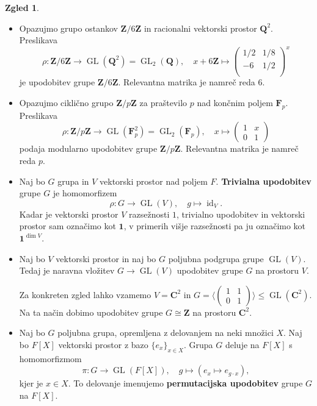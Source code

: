 \documentclass[11pt]{book}
\def\ZZ{\mathbf{Z}}
\def\QQ{\mathbf{Q}}
\def\CC{\mathbf{C}}
\def\oneone{\mathbf{1}}
\def\FF{\mathbf{F}}
\DeclareMathOperator\GL{GL}
\DeclareMathOperator\id{id}
\def\definicija{\color{rdeca}\bf}
\theoremstyle{definition}
\theoremstyle{zgled}
\newtheorem{zgled}[theorem]{Zgled}
\theoremstyle{zgledbrezstevilke}
\theoremstyle{odprtproblem}
\theoremstyle{domacanaloga}
\theoremstyle{izrek}
\begin{document}
\begin{zgled}
\begin{itemize}
        \item Opazujmo grupo ostankov $\ZZ/6\ZZ$ in racionalni vektorski prostor $\QQ^2$. Preslikava
        \[
            \rho \colon \ZZ/6\ZZ \to \GL(\QQ^2) = {\textstyle \GL_2(\QQ)}, \quad
            x + 6 \ZZ \mapsto  \begin{pmatrix}
                1/2 & 1/8 \\
                -6 & 1/2 \\
            \end{pmatrix}^x
        \]
        je upodobitev grupe $\ZZ/6\ZZ$. Relevantna matrika je namreč reda $6$.
        
        \item Opazujmo ciklično grupo $\ZZ/p\ZZ$ za praštevilo $p$ nad končnim poljem $\FF_p$. Preslikava
        \[
          \rho \colon \ZZ/p\ZZ \to \GL(\FF_p^2) = {\textstyle \GL_2(\FF_p)}, \quad
          x \mapsto \begin{pmatrix}
            1 & x \\ 0 & 1
          \end{pmatrix}
        \]
        podaja modularno upodobitev grupe $\ZZ/p\ZZ$. Relevantna matrika je namreč reda $p$.

        \item Naj bo $G$ grupa in $V$ vektorski prostor nad poljem $F$. {\definicija Trivialna upodobitev} grupe $G$ je homomorfizem
        \[
            \rho \colon G \to \GL(V), \quad
            g \mapsto \textstyle \id_V.
        \]
        Kadar je vektorski prostor $V$ razsežnosti $1$, trivialno upodobitev in vektorski prostor sam označimo kot $\oneone$, v primerih višje razsežnosti pa ju označimo kot $\oneone^{\dim V}$.
        \item Naj bo $V$ vektorski prostor in naj bo $G$ poljubna podgrupa grupe $\GL(V)$. Tedaj je naravna vložitev $G \to \GL(V)$ upodobitev grupe $G$ na prostoru $V$. 
        
        Za konkreten zgled lahko vzamemo $V = \CC^2$ in $G = \langle \left( \begin{smallmatrix} 1 & 1 \\ 0 & 1 \end{smallmatrix} \right) \rangle \leq \GL(\CC^2)$. Na ta način dobimo upodobitev grupe $G \cong \ZZ$ na prostoru $\CC^2$.

        \item Naj bo $G$ poljubna grupa, opremljena z delovanjem na neki množici $X$. Naj bo $F[X]$ vektorski prostor z bazo $\{ e_x \}_{x \in X}$. Grupa $G$ deluje na $F[X]$ s homomorfizmom
        \[
            \pi \colon G \to \GL(F[X]), \quad
            g \mapsto \left( e_x \mapsto e_{g \cdot x} \right),
        \]
        kjer je $x \in X$. To delovanje imenujemo {\definicija permutacijska upodobitev} grupe $G$ na $F[X]$. 
        

\end{itemize}
\end{zgled}
\end{document}
